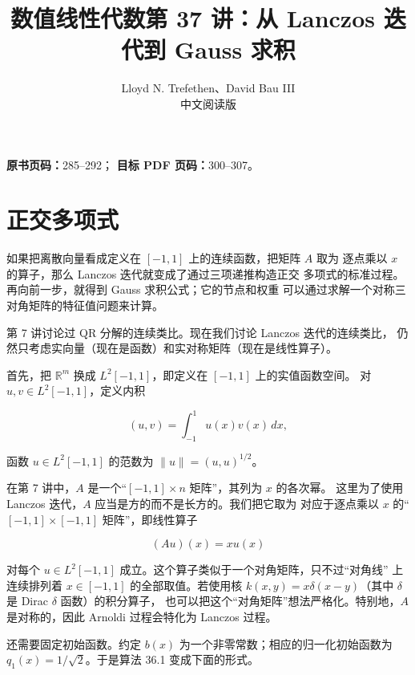 \documentclass[UTF8,fontset=none,12pt]{ctexart}
\title{数值线性代数\quad 第 37 讲：从 Lanczos 迭代到 Gauss 求积}
\author{Lloyd N. Trefethen、David Bau III\\中文阅读版}
\date{}
\begin{document}
\maketitle

\noindent
\textbf{原书页码：}285--292；\quad
\textbf{目标 PDF 页码：}300--307。

\section*{正交多项式}

如果把离散向量看成定义在 $[-1,1]$ 上的连续函数，把矩阵 $A$ 取为
逐点乘以 $x$ 的算子，那么 Lanczos 迭代就变成了通过三项递推构造正交
多项式的标准过程。再向前一步，就得到 Gauss 求积公式；它的节点和权重
可以通过求解一个对称三对角矩阵的特征值问题来计算。

第 7 讲讨论过 QR 分解的连续类比。现在我们讨论 Lanczos 迭代的连续类比，
仍然只考虑实向量（现在是函数）和实对称矩阵（现在是线性算子）。

首先，把 $\mathbb R^m$ 换成 $L^2[-1,1]$，即定义在 $[-1,1]$ 上的实值函数空间。
对 $u,v\in L^2[-1,1]$，定义内积

\begin{equation}
(u,v)=\int_{-1}^{1}u(x)v(x)\,dx,
\tag{37.1}
\end{equation}

函数 $u\in L^2[-1,1]$ 的范数为 $\lVert u\rVert=(u,u)^{1/2}$。

在第 7 讲中，$A$ 是一个“$[-1,1]\times n$ 矩阵”，其列为 $x$ 的各次幂。
这里为了使用 Lanczos 迭代，$A$ 应当是方的而不是长方的。我们把它取为
对应于逐点乘以 $x$ 的“$[-1,1]\times[-1,1]$ 矩阵”，即线性算子

\begin{equation}
(Au)(x)=xu(x)
\tag{37.2}
\end{equation}

对每个 $u\in L^2[-1,1]$ 成立。这个算子类似于一个对角矩阵，只不过“对角线”
上连续排列着 $x\in[-1,1]$ 的全部取值。若使用核
$k(x,y)=x\delta(x-y)$（其中 $\delta$ 是 Dirac $\delta$ 函数）的积分算子，
也可以把这个“对角矩阵”想法严格化。特别地，$A$ 是对称的，因此 Arnoldi
过程会特化为 Lanczos 过程。

还需要固定初始函数。约定 $b(x)$ 为一个非零常数；相应的归一化初始函数为
$q_1(x)=1/\sqrt{2}$。于是算法 36.1 变成下面的形式。
\end{document}
